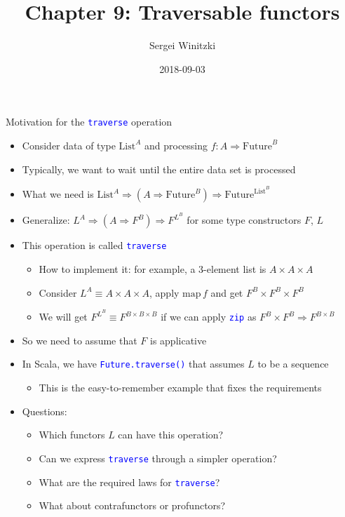 \documentclass[english]{beamer}
\title[Chapter 9: Traversable functors]{Chapter 9: Traversable functors}
\author{Sergei Winitzki}
\date{2018-09-03}
\institute[ABTB]{Academy by the Bay}
\begin{document}
\frame{\titlepage}
\begin{frame}{Motivation for the \texttt{\textcolor{blue}{\footnotesize{}traverse}}
operation}
\begin{itemize}
\item Consider data of type $\text{List}^{A}$ and processing $f:A\Rightarrow\text{Future}^{B}$
\item Typically, we want to wait until the entire data set is processed
\item What we need is $\text{List}^{A}\Rightarrow\left(A\Rightarrow\text{Future}^{B}\right)\Rightarrow\text{Future}^{\text{List}^{B}}$
\item Generalize: $L^{A}\Rightarrow\left(A\Rightarrow F^{B}\right)\Rightarrow F^{L^{B}}$
for some type constructors $F$, $L$
\item This operation is called \texttt{\textcolor{blue}{\footnotesize{}traverse}} 
\begin{itemize}
\item How to implement it: for example, a 3-element list is $A\times A\times A$
\item Consider $L^{A}\equiv A\times A\times A$, apply $\text{map}\,f$
and get $F^{B}\times F^{B}\times F^{B}$
\item We will get $F^{L^{B}}\equiv F^{B\times B\times B}$ if we can apply
\texttt{\textcolor{blue}{\footnotesize{}zip}} as $F^{B}\times F^{B}\Rightarrow F^{B\times B}$
\end{itemize}
\item So we need to assume that $F$ is applicative
\item In Scala, we have \texttt{\textcolor{blue}{\footnotesize{}Future.traverse()}}
that assumes $L$ to be a sequence
\begin{itemize}
\item This is the easy-to-remember example that fixes the requirements
\end{itemize}
\item Questions:
\begin{itemize}
\item Which functors $L$ can have this operation?
\item Can we express \texttt{\textcolor{blue}{\footnotesize{}traverse}}
through a simpler operation?
\item What are the required laws for \texttt{\textcolor{blue}{\footnotesize{}traverse}}?
\item What about contrafunctors or profunctors?
\end{itemize}
\end{itemize}
\end{frame}
\end{document}
